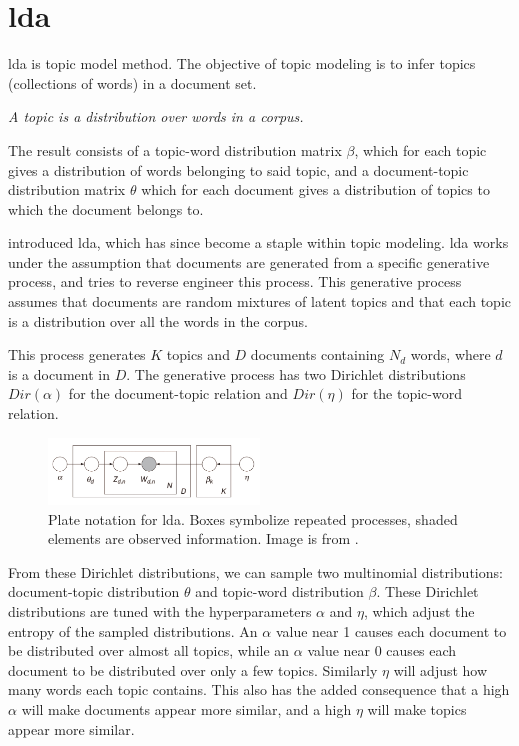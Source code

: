 \section{\acrlong{lda}}\label{sec:lda}
\Gls{lda} is topic model method. The objective of topic modeling is to infer topics (collections of words) in a document set.

\begin{definition}\label{def:topic}
	\textit{A topic is a distribution over words in a corpus.}
\end{definition}

The result consists of a topic-word distribution matrix $\beta$, which for each topic gives a distribution of words belonging to said topic, and a document-topic distribution matrix $\theta$ which for each document gives a distribution of topics to which the document belongs to.

\citeauthor{lda} \cite{lda} introduced \gls{lda}, which has since become a staple within topic modeling.
\gls{lda} works under the assumption that documents are generated from a specific generative process, and tries to reverse engineer this process.
This generative process assumes that documents are random mixtures of latent topics and that each topic is a distribution over all the words in the corpus.

This process generates $K$ topics and $D$ documents containing $N_{d}$ words, where $d$ is a document in $D$.
The generative process has two Dirichlet distributions $Dir(\alpha)$ for the document-topic relation and $Dir(\eta)$ for the topic-word relation.

\begin{figure}[h]
	\centering
	\includegraphics[width=0.5\textwidth]{figures/Smoothed_LDA.jpg}
	\caption{Plate notation for \gls{lda}. Boxes symbolize repeated processes, shaded elements are observed information. Image is from \citet{blei2012topicmodels}.}
	\label{fig:lda}
\end{figure}
From these Dirichlet distributions, we can sample two multinomial distributions: document-topic distribution $\theta$ and topic-word distribution $\beta$.
These Dirichlet distributions are tuned with the hyperparameters $\alpha$ and $\eta$, which adjust the entropy of the sampled distributions.
An $\alpha$ value near 1 causes each document to be distributed over almost all topics, while an $\alpha$ value near 0 causes each document to be distributed over only a few topics.
Similarly $\eta$ will adjust how many words each topic contains.
This also has the added consequence that a high $\alpha$ will make documents appear more similar, and a high $\eta$ will make topics appear more similar.

